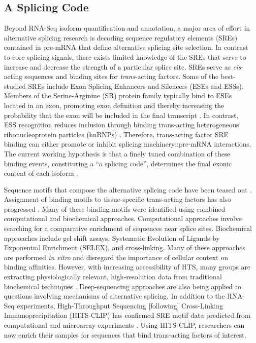   \subsection{A Splicing Code}
    \label{Intro:subsec:Splicing Code}

    Beyond RNA-Seq isoform quantification and annotation, a major area of effort in alternative splicing research is decoding sequence regulatory elements (SREs) contained in pre-mRNA that define alternative splicing site selection. In contrast to core splicing signals, there exists limited knowledge of the SREs that serve to increase and decrease the strength of a particular splice site. SREs serve as \textit{cis}-acting sequences and binding sites for \textit{trans}-acting factors. Some of the best-studied SREs include Exon Splicing Enhancers and Silencers (ESEs and ESSs). Members of the Serine-Arginine (SR) protein family typically bind to ESEs located in an exon, promoting exon definition and thereby increasing the probability that the exon will be included in the final transcript \citep{Graveley2000,Long2009,Nilsen2010}. In contrast, ESS recognition reduces inclusion through binding trans-acting heterogeneous ribonucleoprotein particles (hnRNPs) \citep{Martinez-Contreras2007}. Therefore, trans-acting factor SRE binding can either promote or inhibit splicing machinery::pre-mRNA interactions. The current working hypothesis is that a finely tuned combination of these binding events, constituting a ``a splicing code'', determines the final exonic content of each isoform \citep{House2008}.

    Sequence motifs that compose the alternative splicing code have been teased out \citep{Ladd2002, Barash2010}. Assignment of binding motifs to tissue-specific trans-acting factors has also progressed \citep{Jin2003,Ule2005,Licatalosi2008}. Many of these binding motifs were identified using combined computational and biochemical approaches. Computational approaches involve searching for a comparative enrichment of sequences near splice sites. Biochemical approaches include gel shift assays, Systematic Evolution of Ligands by Exponential Enrichment (SELEX), and cross-linking. Many of these approaches are performed \textit{in vitro} and disregard the importance of cellular context on binding affinities. However, with increasing accessibility of HTS, many groups are extracting physiologically relevant, high-resolution data from traditional biochemical techniques \citep{Ingolia2009, Ingolia2011}. Deep-sequencing approaches are also being applied to questions involving mechanisms of alternative splicing. In addition to the RNA-Seq experiments, High-Throughput Sequencing [following] Cross-Linking Immunoprecipitation (HITS-CLIP) has confirmed SRE motif data predicted from computational and microarray experiments \citep{Licatalosi2008,Hafner2010}. Using HITS-CLIP, researchers can now enrich their samples for sequences that bind trans-acting factors of interest.

